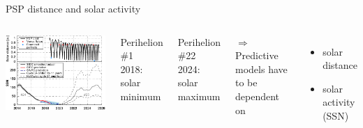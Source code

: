 \begin{frame}[plain,c,label=psp_dist_ssn]{PSP distance and solar activity}{}
	\begin{columns}[c]
		
		\includegraphics[width=\textwidth]{../figures_paper/SPP_orbit_predicted_SSN_overview_f_plot.pdf}

		
		Perihelion \#1\\
		2018: solar minimum\\\ 
		
		Perihelion \#22\\
		2024: solar maximum\\\ 
		
		$\Rightarrow$ Predictive models have to be dependent on
		\begin{itemize}
			\item solar distance
			\item solar activity (SSN)
		\end{itemize}


	\end{columns}
\end{frame}

